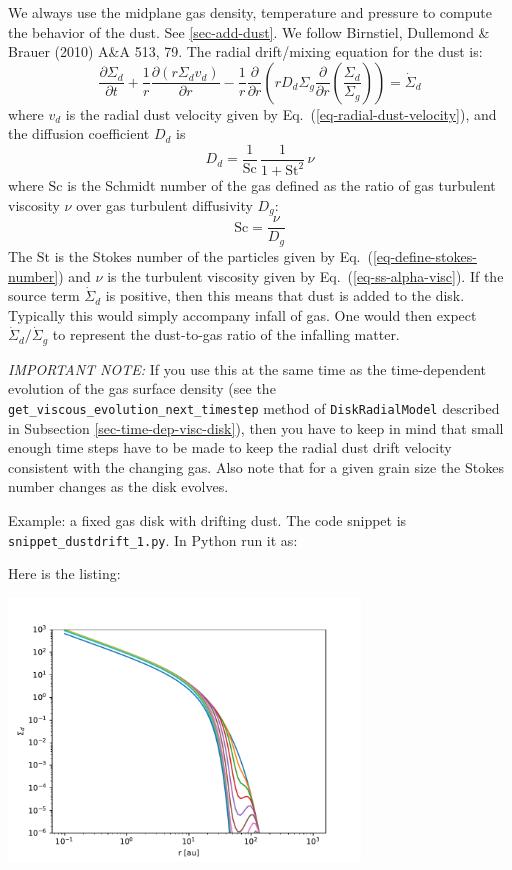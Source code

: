 \documentclass{book}
\newcommand{\code}[1]{{\small\tt #1}}
\begin{document}
We always use the midplane gas density, temperature and pressure to compute the
behavior of the dust. See \ref{sec-add-dust}. We follow Birnstiel, Dullemond \&
Brauer (2010) A\&A 513, 79. The radial drift/mixing equation for the dust
is:
\begin{equation}
  \frac{\partial \Sigma_d}{\partial t}
  + \frac{1}{r}\frac{\partial (r \Sigma_d v_d)}{\partial r}
  - \frac{1}{r}\frac{\partial }{\partial r}\left(r D_d \Sigma_g \frac{\partial }{\partial r}
  \left(\frac{\Sigma_d}{\Sigma_g}\right)\right) = \dot\Sigma_d
\end{equation}
where $v_d$ is the radial dust velocity given by
Eq.~(\ref{eq-radial-dust-velocity}), and the diffusion coefficient $D_d$ is
\begin{equation}
D_d = \frac{1}{\mathrm{Sc}}\,\frac{1}{1+\mathrm{St}^2}\,\nu
\end{equation}
where $\mathrm{Sc}$ is the Schmidt number of the gas defined as the ratio of
gas turbulent viscosity $\nu$ over gas turbulent diffusivity $D_g$:
\begin{equation}
\mathrm{Sc} = \frac{\nu}{D_g}
\end{equation}
The $\mathrm{St}$ is the Stokes number of the particles given by
Eq.~(\ref{eq-define-stokes-number}) and $\nu$ is the turbulent viscosity given
by Eq.~(\ref{eq-ss-alpha-visc}). If the source term $\dot\Sigma_d$ is positive,
then this means that dust is added to the disk. Typically this would simply
accompany infall of gas. One would then expect $\dot\Sigma_d/\dot\Sigma_g$ to
represent the dust-to-gas ratio of the infalling matter.

{\em IMPORTANT NOTE:} If you use this at the same time as the time-dependent
evolution of the gas surface density (see the {\small\tt
  get\_viscous\_evolution\_next\_timestep} method of \code{DiskRadialModel} described
in Subsection \ref{sec-time-dep-visc-disk}), then you have to keep in mind that
small enough time steps have to be made to keep the radial dust drift velocity
consistent with the changing gas. Also note that for a given grain size the
Stokes number changes as the disk evolves.

Example: a fixed gas disk with drifting dust. The code snippet is
\code{snippet\_dustdrift\_1.py}. In Python run it as:
\begin{codebox}
\end{codebox}
Here is the listing:

\centerline{\includegraphics[width=0.7\textwidth]{../snippets/fig_snippet_dustdrift_1_1.pdf}}
\end{document}
